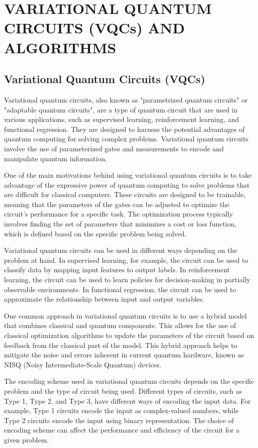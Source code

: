 \documentclass[inscr,ack,preface]{diphdthesis}
\begin{document}
\chapter{VARIATIONAL QUANTUM CIRCUITS (VQCs) AND ALGORITHMS}

\section{Variational Quantum Circuits (VQCs)}

Variational quantum circuits, also known as "parametrized quantum circuits" or "adaptable quantum circuits", are a type of quantum circuit that are used in various applications, such as supervised learning, reinforcement learning, and functional regression. They are designed to harness the potential advantages of quantum computing for solving complex problems. Variational quantum circuits involve the use of parameterized gates and measurements to encode and manipulate quantum information.

One of the main motivations behind using variational quantum circuits is to take advantage of the expressive power of quantum computing to solve problems that are difficult for classical computers. These circuits are designed to be trainable, meaning that the parameters of the gates can be adjusted to optimize the circuit's performance for a specific task. The optimization process typically involves finding the set of parameters that minimizes a cost or loss function, which is defined based on the specific problem being solved.

Variational quantum circuits can be used in different ways depending on the problem at hand. In supervised learning, for example, the circuit can be used to classify data by mapping input features to output labels. In reinforcement learning, the circuit can be used to learn policies for decision-making in partially observable environments. In functional regression, the circuit can be used to approximate the relationship between input and output variables.

One common approach in variational quantum circuits is to use a hybrid model that combines classical and quantum components. This allows for the use of classical optimization algorithms to update the parameters of the circuit based on feedback from the classical part of the model. This hybrid approach helps to mitigate the noise and errors inherent in current quantum hardware, known as NISQ (Noisy Intermediate-Scale Quantum) devices.

The encoding scheme used in variational quantum circuits depends on the specific problem and the type of circuit being used. Different types of circuits, such as Type 1, Type 2, and Type 3, have different ways of encoding the input data. For example, Type 1 circuits encode the input as complex-valued numbers, while Type 2 circuits encode the input using binary representation. The choice of encoding scheme can affect the performance and efficiency of the circuit for a given problem.
\end{document}
